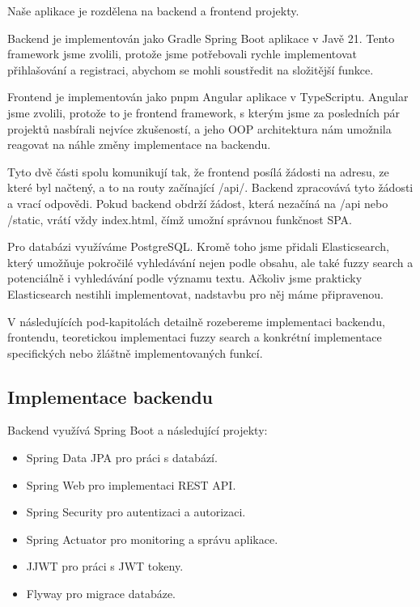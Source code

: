 Naše aplikace je rozdělena na backend a frontend projekty.

Backend je implementován jako Gradle Spring Boot aplikace v Javě 21. Tento
framework jsme zvolili, protože jsme potřebovali rychle implementovat
přihlašování a registraci, abychom se mohli soustředit na složitější funkce.

Frontend je implementován jako pnpm Angular aplikace v TypeScriptu. Angular
jsme zvolili, protože to je frontend framework, s kterým jsme za posledních pár
projektů nasbírali nejvíce zkušeností, a jeho OOP architektura nám umožnila
reagovat na náhle změny implementace na backendu.

Tyto dvě části spolu komunikují tak, že frontend posílá žádosti na adresu, ze
které byl načtený, a to na routy začínající /api/. Backend zpracovává tyto
žádosti a vrací odpovědi. Pokud backend obdrží žádost, která nezačíná na /api
nebo /static, vrátí vždy index.html, čímž umožní správnou funkčnost SPA.

Pro databázi využíváme PostgreSQL. Kromě toho jsme přidali Elasticsearch, který
umožňuje pokročilé vyhledávání nejen podle obsahu, ale také fuzzy search a
potenciálně i vyhledávání podle významu textu. Ačkoliv jsme prakticky
Elasticsearch nestihli implementovat, nadstavbu pro něj máme připravenou.

V následujících pod-kapitolách detailně rozebereme implementaci backendu,
frontendu, teoretickou implementaci fuzzy search a konkrétní implementace
specifických nebo žláštně implementovaných funkcí. %

\subsection{Implementace backendu}

Backend využívá Spring Boot a následující projekty:

\begin{itemize}
    \item Spring Data JPA pro práci s databází.
    \item Spring Web pro implementaci REST API.
    \item Spring Security pro autentizaci a autorizaci.
    \item Spring Actuator pro monitoring a správu aplikace.
    \item JJWT pro práci s JWT tokeny.
    \item Flyway pro migrace databáze.
\end{itemize}

